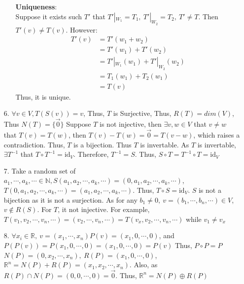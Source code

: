 \documentclass{article}
\begin{document}
\begin{itemize}
\begin{itemize}
                \textbf{Uniqueness}:\\
                Suppose it exists such \(T'\) that \(T'|_{W_1}=T_1,\ T'|_{W_2} = T_2,\ T'\neq T\). Then \(T'(v)\neq T(v)\). 
                However:
                \begin{align*}
                    T'(v) &= T'(w_1+w_2)\\
                            &= T'(w_1)+T'(w_2)\\
                            &= T'|_{W_1}(w_1)+T'|_{W_2}(w_2)\\
                            &= T_1(w_1)+T_2(w_1)\\
                            &= T(v)
                \end{align*}
                Thus, it is unique.
\end{itemize}
\item [6.]\(\forall v\in V, T(S(v)) = v\), Thus, \(T\) is Surjective, Thus, \(R(T)=dim(V)\), Thus \(N(T)=\{\overrightarrow{0}\}\)
Suppose \(T\) is not injective, then \(\exists v,w \in V\) that \(v\neq w\) that \(T(v)=T(w)\), then \(T(v)-T(w)=\overrightarrow{0}=T(v-w)\), which raises a contradiction. Thus, \(T\) is a bijection. Thus \(T\) is invertable.
As \(T\) is invertable, \(\exists T^{-1}\) that \(T\circ T^{-1} = \text{id}_V\). Therefore, \(T^{-1} = S\). Thus, \(S\circ T = T^{-1}\circ T = \text{id}_V\)
\item [7.] Take a random set of \(a_1,\cdots,a_k,\cdots\in \mathbb{N}, S(a_1,a_2,\cdots,a_k,\cdots)=(0,a_1,a_2,\cdots,a_k,\cdots)\),
            \(T(0,a_1,a_2,\cdots,a_k,\cdots)=(a_1,a_2,\cdots,a_k,\cdots)\). Thus, \(T\circ S = \text{id}_V\). \(S\) is not a bijection as it is not a surjection. As for any \(b_1\neq 0, \ v =  (b_1,\cdots,b_n,\cdots)\in V\), \(v\notin R(S)\). For \(T\), it not injective. 
            For example, \(T(v_1,v_2,\cdots,v_n,\cdots) =(v_2,\cdots,v_n,\cdots)=T(v_x,v_2,\cdots,v_n,\cdots)\) while \(v_1\neq v_x\)
\item [8.] \(\forall x_i\in\mathbb{R},\ v=(x_1,\cdots,x_n) P(v) = (x_1,0,\cdots,0) \), and \(P(P(v)) = P(x_1,0,\cdots,0) = (x_1,0,\cdots,0) = P(v)\)
Thus, \(P\circ P = P\)\\
\(N(P) = (0,x_2,\cdots,x_n),\ R(P) = (x_1,0,\cdots,0)\), \(\mathbb{R}^n = N(P)+R(P) = (x_1,x_2,\cdots,x_n)\). Also, as \(R(P)\cap N(P) = (0,0,\cdots,0)=\overrightarrow{0}\). Thus, \(\mathbb R ^n = N(P)\oplus R(P)\)
\end{itemize}
\end{document}
